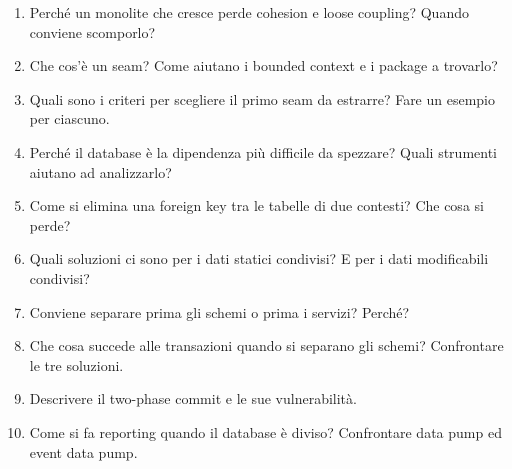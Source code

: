 \begin{domande}
\begin{enumerate}
  \item Perché un monolite che cresce perde cohesion e loose coupling? Quando conviene scomporlo?
  \item Che cos'è un seam? Come aiutano i bounded context e i package a trovarlo?
  \item Quali sono i criteri per scegliere il primo seam da estrarre? Fare un esempio per ciascuno.
  \item Perché il database è la dipendenza più difficile da spezzare? Quali strumenti aiutano ad analizzarlo?
  \item Come si elimina una foreign key tra le tabelle di due contesti? Che cosa si perde?
  \item Quali soluzioni ci sono per i dati statici condivisi? E per i dati modificabili condivisi?
  \item Conviene separare prima gli schemi o prima i servizi? Perché?
  \item Che cosa succede alle transazioni quando si separano gli schemi? Confrontare le tre soluzioni.
  \item Descrivere il two-phase commit e le sue vulnerabilità.
  \item Come si fa reporting quando il database è diviso? Confrontare data pump ed event data pump.
\end{enumerate}
\end{domande}
